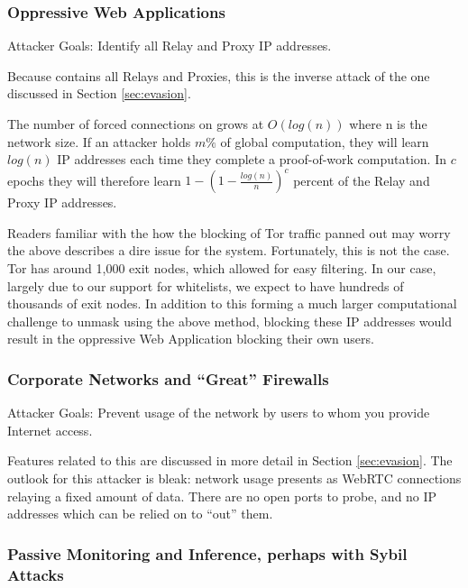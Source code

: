 
\subsubsection*{Oppressive Web Applications}

Attacker Goals: Identify all \Orchid{} Relay and Proxy IP addresses.

Because \tOM{} contains all Relays and Proxies, this is the inverse
attack of the one discussed in Section \ref{sec:evasion}.

The number of forced connections on \tOM{} grows at $O(log{}(n))$ where
n is the network size. If an attacker holds $m\%$ of global
computation, they will learn $log(n)$ IP addresses each time they
complete a proof-of-work computation. In $c$ epochs they will
therefore learn $1 - (1 - \frac{log(n)}{n})^c$ percent of the Relay and
Proxy IP addresses.

Readers familiar with the how the blocking of Tor traffic panned out
may worry the above describes a dire issue for the system.
Fortunately, this is not the case. Tor has around 1,000 exit 
nodes, which allowed for easy filtering. In our case, largely due to
our support for whitelists, we expect to have hundreds of thousands of
exit nodes. In addition to this forming a much larger computational
challenge to unmask using the above method, blocking these IP
addresses would result in the oppressive Web Application blocking
their own users.

\subsubsection*{Corporate Networks and ``Great'' Firewalls}

Attacker Goals: Prevent usage of the \Orchid{} network by users to whom
you provide Internet access.

Features related to this are discussed in more detail in Section
\ref{sec:evasion}. The outlook for this attacker is bleak: \Orchid{}
network usage presents as WebRTC connections relaying a fixed amount
of data. There are no open ports to probe, and no IP addresses which
can be relied on to ``out'' them.

\subsubsection*{Passive Monitoring and Inference, perhaps with Sybil Attacks}

